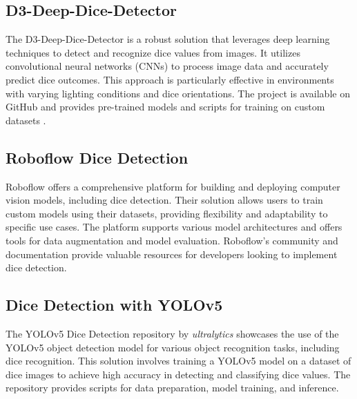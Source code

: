 \subsection{D3-Deep-Dice-Detector}

The D3-Deep-Dice-Detector is a robust solution that leverages deep learning techniques to detect and recognize dice values from images. It utilizes convolutional neural networks (CNNs) to process image data and accurately predict dice outcomes. This approach is particularly effective in environments with varying lighting conditions and dice orientations. The project is available on GitHub and provides pre-trained models and scripts for training on custom datasets \cite{bib:D3-Dice}.

\subsection{Roboflow Dice Detection}

Roboflow \cite{bib:roboflow} offers a comprehensive platform for building and deploying computer vision models, including dice detection. Their solution allows users to train custom models using their datasets, providing flexibility and adaptability to specific use cases. The platform supports various model architectures and offers tools for data augmentation and model evaluation. Roboflow's community and documentation provide valuable resources for developers looking to implement dice detection.

\subsection{Dice Detection with YOLOv5}

The YOLOv5 Dice Detection \cite{bib:YOLOv5} repository by \textit{ultralytics} showcases the use of the YOLOv5 object detection model for various object recognition tasks, including dice recognition. This solution involves training a YOLOv5 model on a dataset of dice images to achieve high accuracy in detecting and classifying dice values. The repository provides scripts for data preparation, model training, and inference.